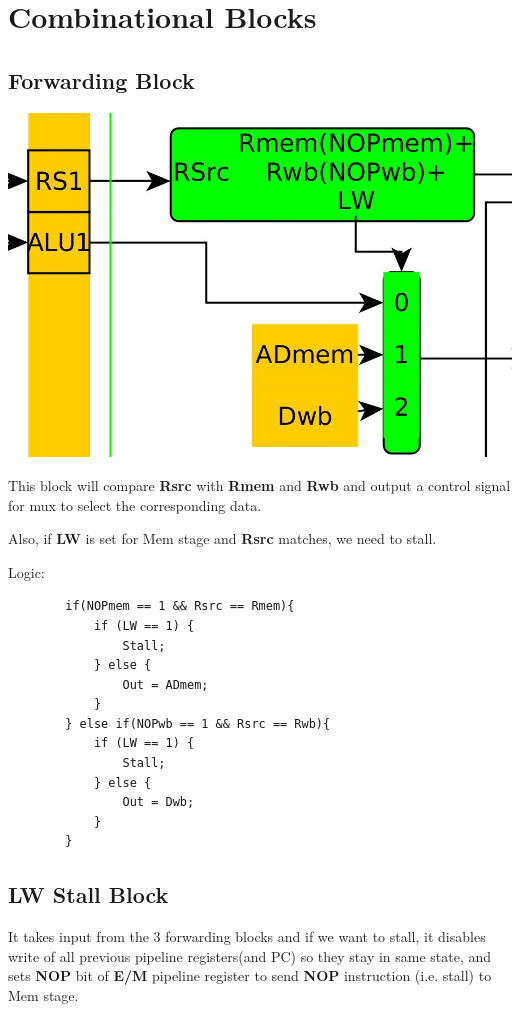 \documentclass{article}
\begin{document}
\pagebreak
\section*{Combinational Blocks}
\subsection*{Forwarding Block}

\includegraphics[scale=0.4]{forwarding_block}

This block will compare \textbf{Rsrc} with \textbf{Rmem} and \textbf{Rwb} and
output a control signal for mux to select the corresponding data.

Also, if \textbf{LW} is set for Mem stage and \textbf{Rsrc} matches, we need to
stall.

Logic:
    \begin{lstlisting}
        if(NOPmem == 1 && Rsrc == Rmem){
            if (LW == 1) {
                Stall;
            } else {
                Out = ADmem;
            }
        } else if(NOPwb == 1 && Rsrc == Rwb){
            if (LW == 1) {
                Stall;
            } else {
                Out = Dwb;
            }
        }

    \end{lstlisting}

\subsection*{LW Stall Block}
It takes input from the 3 forwarding blocks and if we want to stall, it disables
write of all previous pipeline registers(and PC) so they stay in same state, and sets 
\textbf{NOP} bit of \textbf{E/M} pipeline register to send \textbf{NOP} instruction (i.e. stall) to Mem stage.
\end{document}
